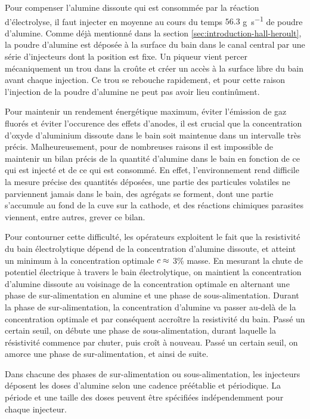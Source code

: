 Pour compenser l'alumine dissoute qui est consommée par la réaction
d'électrolyse, il faut injecter en moyenne au cours du temps $56.3$
\si{\gram\per\second} de poudre d'alumine. Comme déjà mentionné dans
la section \ref{sec:introduction-hall-heroult}, la poudre d'alumine
est déposée à la surface du bain dans le canal central par une série
d'injecteurs dont la position est fixe. Un piqueur vient percer
mécaniquement un trou dans la croûte et créer un accès à la surface
libre du bain avant chaque injection. Ce trou se rebouche rapidement,
et pour cette raison l'injection de la poudre d'alumine ne peut pas
avoir lieu continûment.

Pour maintenir un rendement énergétique maximum, éviter l'émission de
gaz fluorés et éviter l'occurence des effets d'anodes, il est crucial
que la concentration d'oxyde d'aluminium dissoute dans le bain soit
maintenue dans un intervalle très précis. Malheureusement, pour de
nombreuses raisons il est impossible de maintenir un bilan précis de
la quantité d'alumine dans le bain en fonction de ce qui est injecté
et de ce qui est consommé. En effet, l'environnement rend difficile la
mesure précise des quantités déposées, une partie des particules
volatiles ne parviennent jamais dans le bain, des agrégats se forment,
dont une partie s'accumule au fond de la cuve sur la cathode, et des
réactions chimiques parasites viennent, entre autres, grever ce bilan.

Pour contourner cette difficulté, les opérateurs exploitent le fait
que la resistivité du bain électrolytique dépend de la concentration
d'alumine dissoute, et atteint un minimum à la concentration optimale
$c \approx$ \num{3}\% masse. En mesurant la chute de
potentiel électrique à travers le bain électrolytique, on maintient la
concentration d'alumine dissoute au voisinage de la concentration
optimale en alternant une phase de sur-alimentation en alumine et une
phase de sous-alimentation. Durant la phase de sur-alimentation, la
concentration d'alumine va passer au-delà de la concentration optimale
et par conséquent accroître la resistivité du bain. Passé un certain
seuil, on débute une phase de sous-alimentation, durant laquelle la
résistivité commence par chuter, puis croît à nouveau. Passé un
certain seuil, on amorce une phase de sur-alimentation, et ainsi de
suite.

Dans chacune des phases de sur-alimentation ou sous-alimentation, les
injecteurs déposent les doses d'alumine selon une cadence préétablie
et périodique. La période et une taille des doses peuvent être spécifiées
indépendemment pour chaque injecteur.

